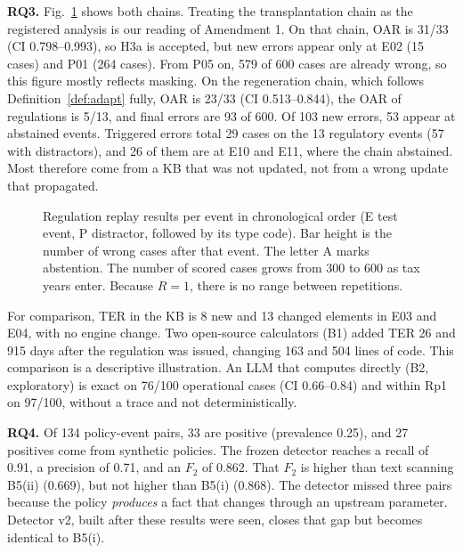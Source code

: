\documentclass[conference]{IEEEtran}
\begin{document}
\textbf{RQ3.} Fig.~\ref{fig:replay} shows both chains. Treating the transplantation chain as the registered analysis is our reading of Amendment 1. On that chain, OAR is 31/33 (CI 0.798--0.993), so H3a is accepted, but new errors appear only at E02 (15 cases) and P01 (264 cases). From P05 on, 579 of 600 cases are already wrong, so this figure mostly reflects masking. On the regeneration chain, which follows Definition~\ref{def:adapt} fully, OAR is 23/33 (CI 0.513--0.844), the OAR of regulations is 5/13, and final errors are 93 of 600. Of 103 new errors, 53 appear at abstained events. Triggered errors total 29 cases on the 13 regulatory events (57 with distractors), and 26 of them are at E10 and E11, where the chain abstained. Most therefore come from a KB that was not updated, not from a wrong update that propagated.

\begin{figure}[t]
\centering
\newcommand{\replaytinggi}{1.5cm}

\caption{Regulation replay results per event in chronological order (E test event, P distractor, followed by its type code). Bar height is the number of wrong cases after that event. The letter A marks abstention. The number of scored cases grows from 300 to 600 as tax years enter. Because $R = 1$, there is no range between repetitions.}
\label{fig:replay}
\end{figure}

For comparison, TER in the KB is 8 new and 13 changed elements in E03 and E04, with no engine change. Two open-source calculators (B1) added TER 26 and 915 days after the regulation was issued, changing 163 and 504 lines of code. This comparison is a descriptive illustration. An LLM that computes directly (B2, exploratory) is exact on 76/100 operational cases (CI 0.66--0.84) and within Rp1 on 97/100, without a trace and not deterministically.

\textbf{RQ4.} Of 134 policy-event pairs, 33 are positive (prevalence 0.25), and 27 positives come from synthetic policies. The frozen detector reaches a recall of 0.91, a precision of 0.71, and an $F_2$ of 0.862. That $F_2$ is higher than text scanning B5(ii) (0.669), but not higher than B5(i) (0.868). The detector missed three pairs because the policy \emph{produces} a fact that changes through an upstream parameter. Detector v2, built after these results were seen, closes that gap but becomes identical to B5(i).

\end{document}
